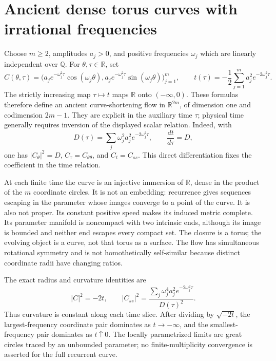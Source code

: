 \chapter{Ancient dense torus curves with irrational frequencies}\label{sec:catalogue-irrational-torus-curves}
\begin{example}\label{ex:catalogue-irrational-torus-curves}
Choose $m\geq2$, amplitudes $a_j>0$, and positive frequencies $\omega_j$ which are linearly independent over $\mathbb Q$. For $\theta,\tau\in\mathbb R$, set
\[
 C(\theta,\tau)=\bigl(a_j e^{-\omega_j^2\tau}\cos(\omega_j\theta),
 a_j e^{-\omega_j^2\tau}\sin(\omega_j\theta)\bigr)_{j=1}^m,
 \qquad t(\tau)=-\frac12\sum_{j=1}^m a_j^2e^{-2\omega_j^2\tau}.
\]
The strictly increasing map $\tau\mapsto t$ maps $\mathbb R$ onto $(-\infty,0)$. These formulas therefore define an ancient curve-shortening flow in $\mathbb R^{2m}$, of dimension one and codimension $2m-1$. They are explicit in the auxiliary time $\tau$; physical time generally requires inversion of the displayed scalar relation. Indeed, with
\[
 D(\tau)=\sum_j\omega_j^2a_j^2e^{-2\omega_j^2\tau},
 \qquad \frac{dt}{d\tau}=D,
\]
one has $|C_\theta|^2=D$, $C_\tau=C_{\theta\theta}$, and $C_t=C_{ss}$. This direct differentiation fixes the coefficient in the time relation.

At each finite time the curve is an injective immersion of $\mathbb R$, dense in the product of the $m$ coordinate circles. It is not an embedding: recurrence gives sequences escaping in the parameter whose images converge to a point of the curve. It is also not proper. Its constant positive speed makes its induced metric complete. Its parameter manifold is noncompact with two intrinsic ends, although its image is bounded and neither end escapes every compact set. The closure is a torus; the evolving object is a curve, not that torus as a surface. The flow has simultaneous rotational symmetry and is not homothetically self-similar because distinct coordinate radii have changing ratios.

The exact radius and curvature identities are
\[
 |C|^2=-2t,\qquad
 |C_{ss}|^2=\frac{\sum_j\omega_j^4 a_j^2e^{-2\omega_j^2\tau}}{D(\tau)^2}.
\]
Thus curvature is constant along each time slice. After dividing by $\sqrt{-2t}$, the largest-frequency coordinate pair dominates as $t\to-\infty$, and the smallest-frequency pair dominates as $t\uparrow0$. The locally parametrized limits are great circles traced by an unbounded parameter; no finite-multiplicity convergence is asserted for the full recurrent curve.


\end{example}
